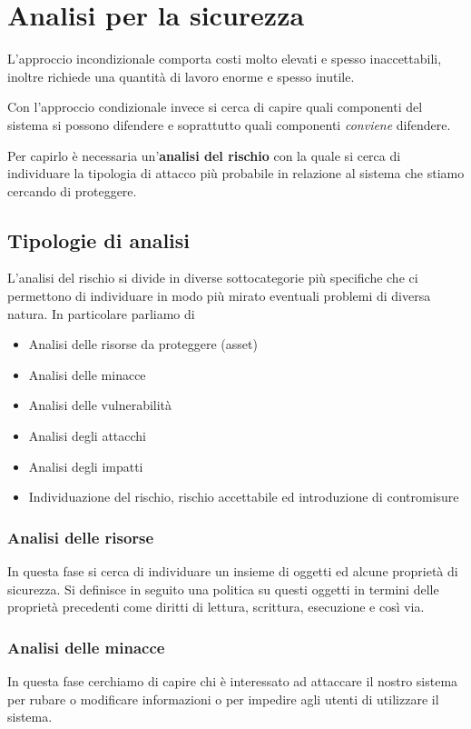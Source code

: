 \chapter{Analisi per la sicurezza}
L'approccio incondizionale comporta costi molto elevati e spesso inaccettabili, inoltre richiede una quantità di lavoro
enorme e spesso inutile.

Con l'approccio condizionale invece si cerca di capire quali componenti del sistema si possono difendere e soprattutto
quali componenti \emph{conviene} difendere.

Per capirlo è necessaria un'\textbf{analisi del rischio} con la quale si cerca di individuare la tipologia di attacco
più probabile in relazione al sistema che stiamo cercando di proteggere.

\section{Tipologie di analisi}
L'analisi del rischio si divide in diverse sottocategorie più specifiche che ci permettono di individuare in modo più
mirato eventuali problemi di diversa natura. In particolare parliamo di
\begin{itemize}
	\item Analisi delle risorse da proteggere (asset)
	\item Analisi delle minacce
	\item Analisi delle vulnerabilità
	\item Analisi degli attacchi
	\item Analisi degli impatti
	\item Individuazione del rischio, rischio accettabile ed introduzione di contromisure
\end{itemize}

\subsection{Analisi delle risorse}
In questa fase si cerca di individuare un insieme di oggetti ed alcune proprietà di sicurezza. Si definisce in seguito
una politica su questi oggetti in termini delle proprietà precedenti come diritti di lettura, scrittura, esecuzione
e così via.

\subsection{Analisi delle minacce}
In questa fase cerchiamo di capire chi è interessato ad attaccare il nostro sistema per rubare o modificare informazioni
o per impedire agli utenti di utilizzare il sistema.

